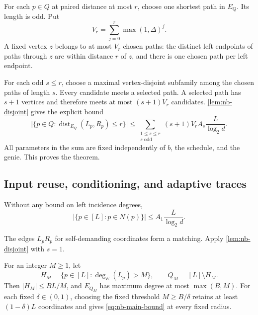 \begin{informalproof}
For each $p\in Q$ at paired distance at most $r$, choose one shortest
path in $E_Q$.  Its length is odd.  Put
\[
 V_r=\sum_{j=0}^{r}\max(1,\Delta)^j.
\]
A fixed vertex $z$ belongs to at most $V_r$ chosen paths: the distinct
left endpoints of paths through $z$ are within distance $r$ of $z$,
and there is one chosen path per left endpoint.

For each odd $s\le r$, choose a maximal vertex-disjoint subfamily among
the chosen paths of length $s$.  Every candidate meets a selected path.
A selected path has $s+1$ vertices and therefore meets at most
$(s+1)V_r$ candidates.  \cref{lem:nb-disjoint} gives the explicit bound
\begin{equation}\label{eq:nb-packing-bound}
 \bigl|\{p\in Q:\operatorname{dist}_{E_Q}(L_p,R_p)\le r\}\bigr|
 \le \sum_{\substack{1\le s\le r\\
s\text{ odd}}}
       (s+1)V_r A_s\frac{L}{\log_2d}.
\end{equation}
All parameters in the sum are fixed independently of $b$, the schedule,
and the genie.  This proves the theorem.
\end{informalproof}

\subsection{Input reuse, conditioning, and adaptive traces}

\begin{corollary}\label{cor:nb-self-demands}
Without any bound on left incidence degrees,
\[
 |\{p\in[L]:p\in N(p)\}|\le A_1\frac{L}{\log_2d}.
\]
\end{corollary}

\begin{informalproof}
The edges $L_pR_p$ for self-demanding coordinates form a matching.
Apply \cref{lem:nb-disjoint} with $s=1$.
\end{informalproof}

\begin{corollary}\label{cor:nb-trim}
For an integer $M\ge1$, let
\[
 H_M=\{p\in[L]:\deg_E(L_p)>M\},\qquad Q_M=[L]\setminus H_M.
\]
Then $|H_M|\le BL/M$, and $E_{Q_M}$ has maximum degree at most
$\max(B,M)$.  For each fixed $\delta\in(0,1)$, choosing the fixed
threshold $M\ge B/\delta$ retains at least $(1-\delta)L$ coordinates
and gives \eqref{eq:nb-main-bound} at every fixed radius.
\end{corollary}


